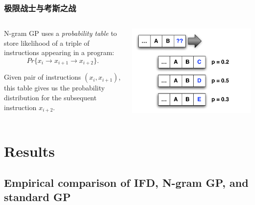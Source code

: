 \documentclass{beamer}
\begin{document}
\begin{frame}
	\frametitle{\textbf{极限战士与考斯之战}}
	
	\begin{columns}
	\begin{column}{0.45\textwidth}
	N-gram GP uses a \emph{probability table} to store likelihood of a triple of instructions appearing in a program:
	\[ Pr\{ x_i \rightarrow x_{i+1} \rightarrow x_{i+2} \}. \]
				
		Given pair of instructions $(x_i, x_{i+1})$, this table gives us the probability distribution for the subsequent instruction $x_{i+2}$.
	\end{column}
	\begin{column}{0.55\textwidth}
	\includegraphics[width=\textwidth]{Fig/FigC.pdf}
	\end{column}
	\end{columns}
\end{frame}

\section[Results]{Results}

\subsection[Empirical results]{Empirical comparison of IFD, N-gram GP, and standard GP}
\end{document}
